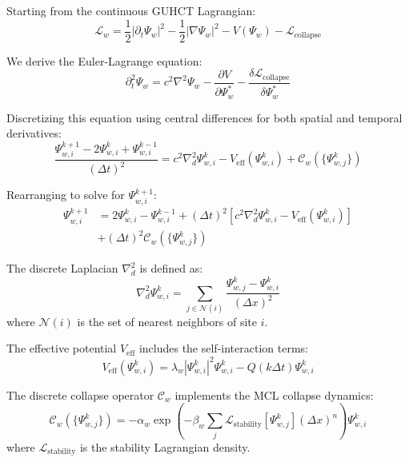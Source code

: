 \documentclass[11pt,a4paper]{article}
\makeatletter
\renewenvironment{proof}[1][\proofname]{\par
  \pushQED{\qed}%
  \normalfont \topsep6\p@\@plus6\p@\relax
  \trivlist
  \item[\hskip\labelsep
        \itshape
    #1\@addpunct{.}]\ignorespaces
}{%
  \popQED\endtrivlist\@endpefalse
}
\makeatother
\begin{document}
\begin{proof}
Starting from the continuous GUHCT Lagrangian:
\begin{equation}
\mathcal{L}_w = \frac{1}{2}|\partial_t\Psi_w|^2 - \frac{1}{2}|\nabla\Psi_w|^2 - V(\Psi_w) - \mathcal{L}_{\text{collapse}}
\end{equation}

We derive the Euler-Lagrange equation:
\begin{equation}
\partial_t^2\Psi_w = c^2\nabla^2\Psi_w - \frac{\partial V}{\partial \Psi_w^*} - \frac{\delta \mathcal{L}_{\text{collapse}}}{\delta \Psi_w^*}
\end{equation}

Discretizing this equation using central differences for both spatial and temporal derivatives:
\begin{equation}
\frac{\Psi_{w,i}^{k+1} - 2\Psi_{w,i}^k + \Psi_{w,i}^{k-1}}{(\Delta t)^2} = c^2 \nabla^2_d \Psi_{w,i}^k - V_{\text{eff}}(\Psi_{w,i}^k) + \mathcal{C}_w(\{\Psi_{w,j}^k\})
\end{equation}

Rearranging to solve for $\Psi_{w,i}^{k+1}$:
\begin{equation}
\begin{aligned}
\Psi_{w,i}^{k+1} &= 2\Psi_{w,i}^k - \Psi_{w,i}^{k-1} + (\Delta t)^2 \left[ c^2 \nabla^2_d \Psi_{w,i}^k - V_{\text{eff}}(\Psi_{w,i}^k) \right] \\
&+ (\Delta t)^2 \mathcal{C}_w(\{\Psi_{w,j}^k\})
\end{aligned}
\end{equation}

The discrete Laplacian $\nabla^2_d$ is defined as:
\begin{equation}
\nabla^2_d \Psi_{w,i}^k = \sum_{j \in \mathcal{N}(i)} \frac{\Psi_{w,j}^k - \Psi_{w,i}^k}{(\Delta x)^2}
\end{equation}
where $\mathcal{N}(i)$ is the set of nearest neighbors of site $i$.

The effective potential $V_{\text{eff}}$ includes the self-interaction terms:
\begin{equation}
V_{\text{eff}}(\Psi_{w,i}^k) = \lambda_w |\Psi_{w,i}^k|^2 \Psi_{w,i}^k - Q(k\Delta t)\Psi_{w,i}^k
\end{equation}

The discrete collapse operator $\mathcal{C}_w$ implements the MCL collapse dynamics:
\begin{equation}
\mathcal{C}_w(\{\Psi_{w,j}^k\}) = -\alpha_w \exp\left(-\beta_w \sum_j \mathcal{L}_{\text{stability}}[\Psi_{w,j}^k] (\Delta x)^n\right) \Psi_{w,i}^k
\end{equation}
where $\mathcal{L}_{\text{stability}}$ is the stability Lagrangian density.
\end{proof}
\end{document}
